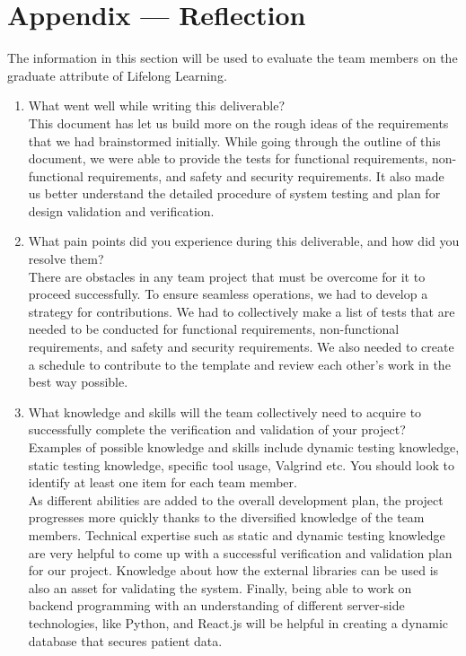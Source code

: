 \documentclass[12pt, titlepage]{article}
\begin{document}
\newpage{}
\section*{Appendix --- Reflection}

The information in this section will be used to evaluate the team members on the
graduate attribute of Lifelong Learning.



\begin{enumerate}
  \item What went well while writing this deliverable?\\
  This document has let us build more on the rough ideas of the requirements that we had brainstormed initially. While going through the outline of this document, we were able to provide the tests for functional requirements, non-functional requirements, and safety and security requirements. It also made us better understand the detailed procedure of system testing and plan for design validation and verification. 
  
  \item What pain points did you experience during this deliverable, and how did you resolve them?\\
  There are obstacles in any team project that must be overcome for it to proceed successfully. To ensure seamless operations, we had to develop a strategy for contributions. We had to collectively make a list of tests that are needed to be conducted for functional requirements, non-functional requirements, and safety and security requirements. We also needed to create a schedule to contribute to the template and review each other's work in the best way possible.

  \item What knowledge and skills will the team collectively need to acquire to successfully complete the verification and validation of your project? Examples of possible knowledge and skills include dynamic testing knowledge, static testing knowledge, specific tool usage, Valgrind etc.  You should look to identify at least one item for each team member.\\
  As different abilities are added to the overall development plan, the project progresses more quickly thanks to the diversified knowledge of the team members. Technical expertise such as static and dynamic testing knowledge are very helpful to come up with a successful verification and validation plan for our project. Knowledge about how the external libraries can be used is also an asset for validating the system. Finally, being able to work on backend programming with an understanding of different server-side technologies, like Python, and React.js will be helpful in creating a dynamic database that secures patient data.


\end{enumerate}
\end{document}
